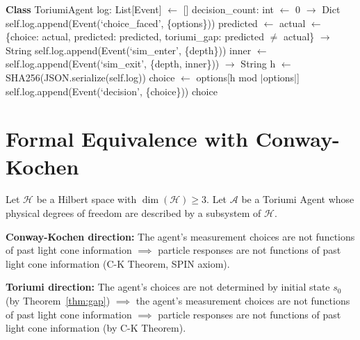 \documentclass[12pt,a4paper]{article}
\theoremstyle{definition}
\theoremstyle{remark}
\newcommand{\cH}{\mathcal{H}}
\newcommand{\cA}{\mathcal{A}}
\begin{document}
\begin{algorithm}[H]
\caption{Toriumi Agent Core Loop}
\label{alg:agent}
\begin{algorithmic}[1]
\State \textbf{Class} ToriumiAgent
\State \quad log: List[Event] $\gets$ [] 
\State \quad decision\_count: int $\gets$ 0
\State
{} $\to$ Dict
    \State self.log.append(Event(`choice\_faced', \{options\}))
    \State predicted $\gets$ 
    \State actual $\gets$ 
    \State \Return \{choice: actual, predicted: predicted,
    \State \qquad\qquad toriumi\_gap: predicted $\neq$ actual\}
\EndFunction
\State
{} $\to$ String
        \State \Return {}
    \EndIf
    \State self.log.append(Event(`sim\_enter', \{depth\}))
    \State inner $\gets$ 
    \State self.log.append(Event(`sim\_exit', \{depth, inner\}))
    \State \Return {}
\EndFunction
\State
{} $\to$ String
    \State h $\gets$ SHA256(JSON.serialize(self.log))
    \State choice $\gets$ options[h mod $|$options$|$]
    \State self.log.append(Event(`decision', \{choice\}))
    \State \Return choice
\EndFunction
\end{algorithmic}
\end{algorithm}

\section{Formal Equivalence with Conway-Kochen}
\label{app:ck}

Let $\cH$ be a Hilbert space with $\dim(\cH) \geq 3$.
Let $\cA$ be a Toriumi Agent whose physical degrees of freedom are described
by a subsystem of $\cH$.

\textbf{Conway-Kochen direction:} The agent's measurement choices are not
functions of past light cone information $\implies$ particle responses are not
functions of past light cone information (C-K Theorem, SPIN axiom).

\textbf{Toriumi direction:} The agent's choices are not determined by initial
state $s_0$ (by Theorem~\ref{thm:gap}) $\implies$ the agent's measurement
choices are not functions of past light cone information $\implies$ particle
responses are not functions of past light cone information (by C-K Theorem).
\end{document}
